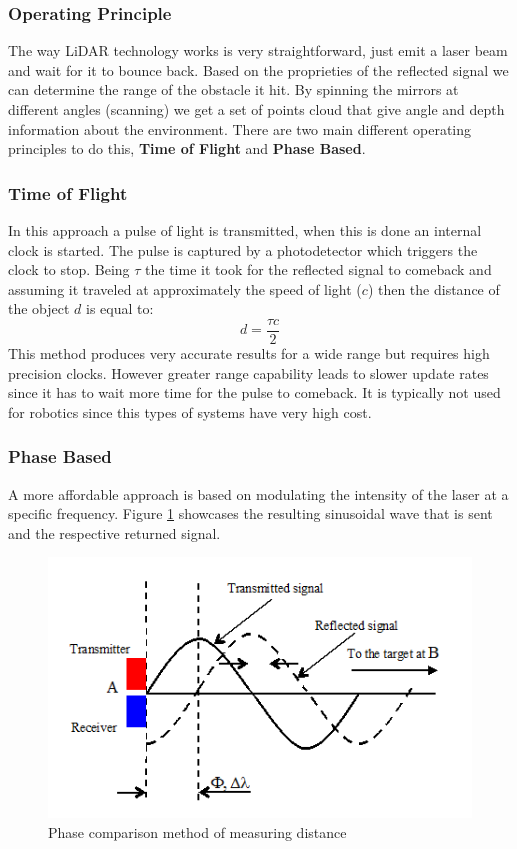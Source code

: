 \subsubsection{Operating Principle}
The way \ac{LiDAR} technology works is very straightforward, just emit a laser beam and wait for it to bounce back. Based on the proprieties of the reflected signal we can determine the range of the obstacle it hit. By spinning the mirrors at different angles (scanning) we get a set of points cloud that give angle and depth information about the environment. There are two main different operating principles to do this, \textbf{Time of Flight} and \textbf{Phase Based}.
\subsubsection*{Time of Flight}
 In this approach a pulse of light is transmitted, when this is done an internal clock is started. The pulse is captured by a photodetector which triggers the clock to stop. Being $\tau$ the time it took for the reflected signal to  comeback and assuming it traveled at approximately the speed of light ($c$) then the distance of the object $d$ is equal to:
\begin{equation}
    d=\frac{\tau c}{2}
\end{equation}
This method produces very accurate results for a wide range but requires high precision clocks. However greater  range capability leads to slower update rates since it has to wait more time for the pulse to comeback.
It is typically not used for robotics since this types of systems have very high cost.
\subsubsection*{Phase Based}
A more affordable approach  is based on modulating the intensity of the laser at a specific frequency. Figure \ref{fig:cwlidar1} showcases the resulting sinusoidal wave that is sent and the respective returned signal. 
\begin{figure}[h] 
\centerline{\includegraphics [width=0.7 \textwidth]{imgs/chapter2/cwlidar1.png}}
\caption{Phase comparison method of measuring distance \cite{cwlidar}}
\label{fig:cwlidar1}
\end{figure}

